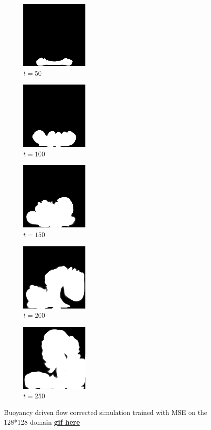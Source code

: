 \documentclass[a4paper,12pt,twoside]{report}
\begin{document}
\begin{figure}
	\centering
	\begin{subfigure}{0.18\textwidth}
		\centering
		\includegraphics[scale=0.56]{buoyancy_test/dens_000050_mse.png}
		\caption{$t=50$}
	\end{subfigure}
	\begin{subfigure}{0.18\textwidth}
		\centering
		\includegraphics[scale=0.56]{buoyancy_test/dens_000100_mse.png}
		\caption{$t=100$}
	\end{subfigure}
	\begin{subfigure}{0.18\textwidth}
		\centering
		\includegraphics[scale=0.56]{buoyancy_test/dens_000150_mse.png}
		\caption{$t=150$}
	\end{subfigure}
	\begin{subfigure}{0.18\textwidth}
		\centering
		\includegraphics[scale=0.56]{buoyancy_test/dens_000200_mse.png}
		\caption{$t=200$}
	\end{subfigure}
	\begin{subfigure}{0.18\textwidth}
		\centering
		\includegraphics[scale=0.56]{buoyancy_test/dens_000249_mse.png}
		\caption{$t=250$}
	\end{subfigure}
	\caption{Buoyancy driven flow corrected simulation trained with MSE on the 128*128 domain \href{https://github.com/w191444052/sol-data/blob/master/buoyancy_high/mse.gif}{\bf{gif here}}}
	\label{sol buoyancy high mse}
\end{figure}
\end{document}
